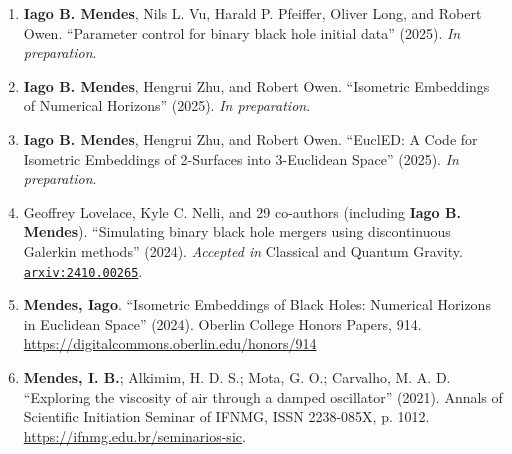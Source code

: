 \begin{enumerate} \setlength\itemsep{-0.1cm}
  \item {\bf Iago B. Mendes}, Nils L. Vu, Harald P. Pfeiffer, Oliver Long, and Robert Owen. ``Parameter control for binary black hole initial data'' (2025). {\em In preparation}.
  \item {\bf Iago B. Mendes}, Hengrui Zhu, and Robert Owen. ``Isometric Embeddings of Numerical Horizons'' (2025). {\em In preparation}.
  \item {\bf Iago B. Mendes}, Hengrui Zhu, and Robert Owen. ``EuclED: A Code for Isometric Embeddings of 2-Surfaces into 3-Euclidean Space'' (2025). {\em In preparation}.
  \item Geoffrey Lovelace, Kyle C. Nelli, and 29 co-authors (including {\bf Iago B. Mendes}). ``Simulating binary black hole mergers using discontinuous Galerkin methods'' (2024). {\em Accepted in} Classical and Quantum Gravity. \href{https://arxiv.org/abs/2410.00265}{{\tt arxiv:2410.00265}}.
  \item {\bf Mendes, Iago}. “Isometric Embeddings of Black Holes: Numerical Horizons in Euclidean Space” (2024). Oberlin College Honors Papers, 914. \url{https://digitalcommons.oberlin.edu/honors/914}
  \item {\bf Mendes, I. B.}; Alkimim, H. D. S.; Mota, G. O.; Carvalho, M. A. D. ``Exploring the viscosity of air through a damped oscillator'' (2021). Annals of Scientific Initiation Seminar of IFNMG, ISSN 2238-085X, p. 1012. \url{https://ifnmg.edu.br/seminarios-sic}.
\end{enumerate}
